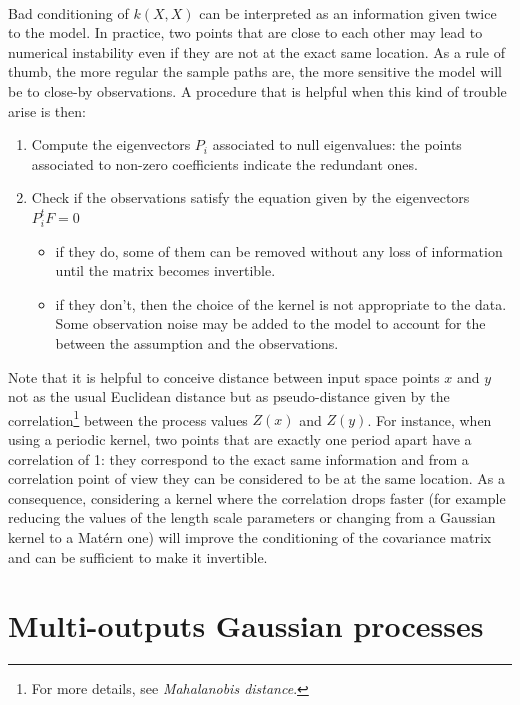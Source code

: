 \documentclass[twoside,openright]{report}
\begin{document}
\paragraph{}
Bad conditioning of $k(X,X)$ can be interpreted as an information given twice to the model. In practice, two points that are close to each other may lead to numerical instability even if they are not at the exact same location. As a rule of thumb, the more regular the sample paths are, the more sensitive the model will be to close-by observations. A procedure that is helpful when this kind of trouble arise is then: 
\begin{enumerate}
	\item Compute the eigenvectors $P_i$ associated to null eigenvalues: the points associated to non-zero coefficients indicate the redundant ones.
	\item Check if the observations satisfy the equation given by the eigenvectors $P_i^t F = 0$
	\begin{itemize}
		\item if they do, some of them can be removed without any loss of information until the matrix becomes invertible.
		\item if they don't, then the choice of the kernel is not appropriate to the data. Some observation noise may be added to the model to account for the between the assumption and the observations.
	\end{itemize}
\end{enumerate}
Note that it is helpful to conceive distance between input space points $x$ and $y$ not as the usual Euclidean distance but as pseudo-distance given by the correlation\footnote{For more details, see \emph{Mahalanobis distance}.} between the process values $Z(x)$ and $Z(y)$. For instance, when using a periodic kernel, two points that are exactly one period apart have a correlation of 1: they correspond to the exact same information and from a correlation point of view they can be considered to be at the same location. As a consequence, considering a kernel where the correlation drops faster (for example reducing the values of the length scale parameters or changing from a Gaussian kernel to a Mat\'ern one) will improve the conditioning of the covariance matrix and can be sufficient to make it invertible.


\section{Multi-outputs Gaussian processes}
\end{document}
